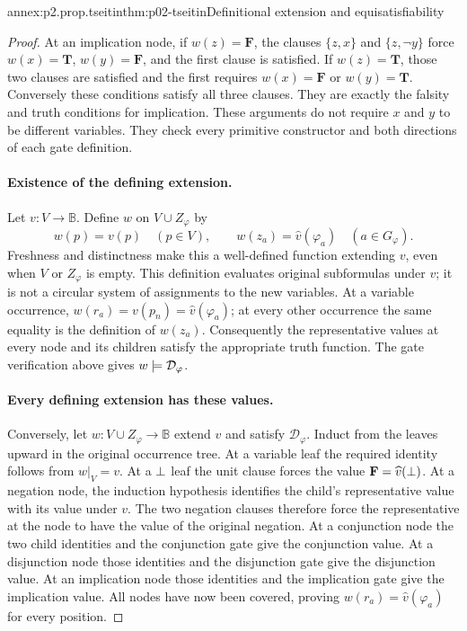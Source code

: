\begin{annexitem}{annex:p2.prop.tseitin}{thm:p02-tseitin}{Definitional extension and equisatisfiability}
\begin{proof}
At an implication node, if \(w(z)=\mathbf{F}\), the clauses \(\{z,x\}\)
and \(\{z,\neg y\}\) force \(w(x)=\mathbf{T}\), \(w(y)=\mathbf{F}\),
and the first clause is satisfied.  If \(w(z)=\mathbf{T}\), those two clauses
are satisfied and the first requires \(w(x)=\mathbf{F}\) or
\(w(y)=\mathbf{T}\).  Conversely these conditions satisfy all three clauses.
They are exactly the falsity and truth conditions for implication.
These arguments do not require \(x\) and \(y\) to be different variables.
They check every primitive constructor and both directions of each gate
definition.

\paragraph{Existence of the defining extension.}
Let \(v:V\to\mathbb{B}\).  Define \(w\) on \(V\cup Z_\varphi\) by
\[
 w(p)=v(p)\quad(p\in V),\qquad
 w(z_a)=\widehat v(\varphi_a)\quad(a\in G_\varphi).
\]
Freshness and distinctness make this a well-defined function extending
\(v\), even when \(V\) or \(Z_\varphi\) is empty.
This definition evaluates original subformulas under \(v\); it is not a
circular system of assignments to the new variables.
At a variable occurrence,
\(w(r_a)=v(p_n)=\widehat v(\varphi_a)\); at every other occurrence the
same equality is the definition of \(w(z_a)\).
Consequently the representative values at every node and its children
satisfy the appropriate truth function.  The gate verification above gives
\(w\models\mathcal D_\varphi\).

\paragraph{Every defining extension has these values.}
Conversely, let \(w:V\cup Z_\varphi\to\mathbb{B}\) extend \(v\) and satisfy
\(\mathcal D_\varphi\).  Induct from the leaves upward in the original
occurrence tree.  At a variable leaf the required identity follows from
\(w|_V=v\).  At a \(\bot\) leaf the unit clause forces the value
\(\mathbf{F}=\widehat v(\bot)\).
At a negation node, the induction hypothesis identifies the child's
representative value with its value under \(v\).  The two negation clauses
therefore force the representative at the node to have the value of the
original negation.  At a conjunction node the two child identities and the
conjunction gate give the conjunction value.  At a disjunction node those
identities and the disjunction gate give the disjunction value.  At an
implication node those identities and the implication gate give the
implication value.  All nodes have now been covered, proving
\(w(r_a)=\widehat v(\varphi_a)\) for every position.


\end{proof}
\end{annexitem}
